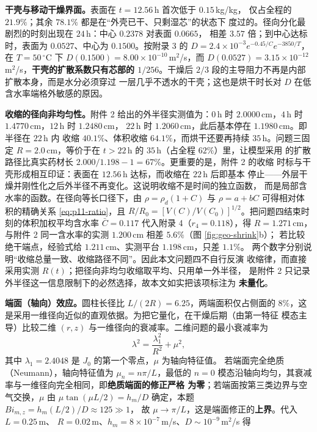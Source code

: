 \documentclass[12pt,a4paper,fontset=none]{ctexart}
\begin{document}
\textbf{干壳与移动干燥界面。}表面在 $t=12.56$\,h 首次低于 $0.15$\,kg/kg，
仅占全程的 $21.9\%$；其余 $78.1\%$ 都是在“外壳已干、只剩湿芯”的状态下
度过的。径向分化最剧烈的时刻出现在 $24$\,h：中心 $0.2378$ 对表面 $0.0665$，
相差 $3.57$ 倍；到中心达标时，表面为 $0.0527$、中心为 $0.1500$。按附录 3
的 $D=2.4\times10^{-3}e^{-0.45/C}e^{-3850/T}$，在 $T=50\,^\circ$C 下
$D(0.1500)=8.00\times10^{-10}$\,m$^2$/s，而
$D(0.0527)=3.15\times10^{-12}$\,m$^2$/s，\textbf{干壳的扩散系数只有芯部的
$1/256$}。干燥后 $2/3$ 段的主导阻力不再是内部扩散本身，而是水分必须穿过
一层几乎不透水的干壳；这也是烘干时长对 $D$ 在低含水率端格外敏感的原因。

\textbf{收缩的径向非均匀性。}附件 2 给出的外半径实测值为：$0$\,h 时
$2.0000$\,cm，$4$\,h 时 $1.4770$\,cm，$12$\,h 时 $1.2480$\,cm，
$22$\,h 时 $1.2060$\,cm，此后基本停在 $1.1980$\,cm。即半径在 $22$\,h 内
收缩 $40.1\%$、体积收缩 $64.1\%$，而烘干还要再持续 $35$\,h。问题三固定
$R=2.0$\,cm，等价于在 $t>22$\,h 的 $35$\,h（占全程 $62\%$）里，让模型采用
的扩散路径比真实药材长 $2.000/1.198-1=67\%$。更重要的是，附件 2 的收缩
时标与干壳形成相互印证：表面在 $12.56$\,h 达标，而收缩在 $22$\,h 后即基本
停止——外层干燥并刚性化之后外半径不再变化。这说明收缩不是时间的独立函数，
而是局部含水率的函数。在径向等长口径下，由 $\rho=\rho_d(1+C)$ 与
$\rho=a+bC$ 可得相对体积的精确关系 \eqref{eq:p11-ratio}，且
$R/R_0=[V(C)/V(C_0)]^{1/2}$。把问题四结束时刻的体积加权平均含水率
$\bar C=0.117$ 代入附录 4（$r_4=0.118$），得 $R=1.271$\,cm，与附件 2
同一含水率的实测 $1.200$\,cm 相差 $5.6\%$（图 \ref{fig:geo-shrink}b）；
若比较绝干端点，经验式给 $1.211$\,cm、实测平台 $1.198$\,cm，只差 $1.1\%$。
两个数字分别说明“收缩总量一致、收缩路径不同”。因此本文问题四不自行反演
收缩律，而直接采用实测 $R(t)$；把径向非均匀收缩取平均、只用单一外半径，
是附件 2 只记录外半径这一信息限制下的必然选择，故本文如实把该项标注为
\textbf{未量化}。

\textbf{端面（轴向）效应。}圆柱长径比 $L/(2R)=6.25$，两端面积仅占侧面的
$8\%$，这是采用一维径向近似的直观依据。为把它量化，在干燥后期（由第一特征
模态主导）比较二维 $(r,z)$ 与一维径向的衰减率。二维问题的最小衰减率为
\[
   \lambda^2=\frac{\lambda_1^2}{R^2}+\mu^2,
\]
其中 $\lambda_1=2.4048$ 是 $J_0$ 的第一个零点，$\mu$ 为轴向特征值。
若端面完全绝质（Neumann），轴向特征值为 $\mu_n=n\pi/L$，最低的 $n=0$
模态沿轴向均匀，其衰减率与一维径向完全相同，即\textbf{绝质端面的修正严格
为零}；若端面按第三类边界与空气交换，$\mu$ 由
$\mu\tan(\mu L/2)=h_m/D$ 确定，本题 $Bi_{m,z}=h_m(L/2)/D\approx125\gg1$，
故 $\mu\to\pi/L$，这是端面修正的\textbf{上界}。代入 $L=0.25$\,m、
$R=0.02$\,m、$h_m=8\times10^{-7}$\,m/s、$D\sim10^{-9}$\,m$^2$/s 得
\end{document}
